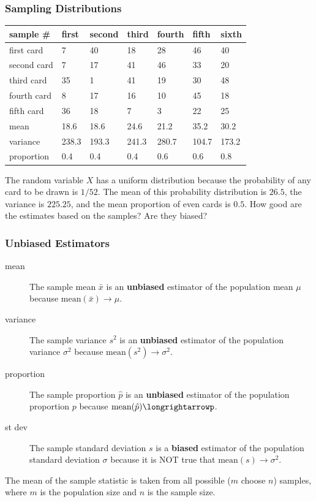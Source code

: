 \documentclass[xcolor=dvipsnames]{beamer}
\begin{document}
\begin{frame}
  \frametitle{Sampling Distributions}
\begin{tabular}{|l|l|l|l|l|l|l|}\hline
  sample \#   & first & second & third & fourth & fifth & sixth \\ \hline
  first card  & 7     & 40     & 18    & 28     & 46    & 40    \\ \hline
  second card & 7     & 17     & 41    & 46     & 33    & 20    \\ \hline
  third card  & 35    & 1      & 41    & 19     & 30    & 48    \\ \hline
  fourth card & 8     & 17     & 16    & 10     & 45    & 18    \\ \hline
  fifth card  & 36    & 18     & 7     & 3      & 22    & 25    \\ \hline
  mean        & 18.6  & 18.6   & 24.6  & 21.2   & 35.2  & 30.2  \\ \hline
  variance    & 238.3 & 193.3  & 241.3 & 280.7  & 104.7 & 173.2 \\ \hline
  proportion  & 0.4   & 0.4    & 0.4   & 0.6    & 0.6   & 0.8   \\ \hline
\end{tabular}

\medskip

The random variable $X$ has a \alert{uniform distribution} because
the probability of any card to be drawn is $1/52$. The mean of
this probability distribution is $26.5$, the variance is $225.25$,
and the mean proportion of even cards is $0.5$. How good are the
estimates based on the samples? Are they biased?
\end{frame}

\begin{frame}
  \frametitle{Unbiased Estimators}
  \begin{description}
  \item[mean] The \alert{sample mean $\bar{x}$} is an \textbf{unbiased}
    estimator of the \alert{population mean $\mu$} because
  $\mbox{mean}(\bar{x})\longrightarrow\mu$.
\item[variance] The \alert{sample variance $s^{2}$} is an \textbf{unbiased}
    estimator of the \alert{population variance $\sigma^{2}$} because
  $\mbox{mean}(s^{2})\longrightarrow\sigma^{2}$.
\item[proportion] The \alert{sample proportion $\hat{p}$} is an \textbf{unbiased}
    estimator of the \alert{population proportion $p$} because
  $\mbox{mean}(\hat{p})\longrightarrowp$.
\item[st dev] The \alert{sample standard deviation $s$} is a
  \textbf{biased} estimator of the \alert{population standard
    deviation $\sigma$} because it is NOT true that
  $\mbox{mean}(s)\longrightarrow\sigma^{2}$.
  \end{description}
  The mean of the sample statistic is taken from all possible ($m$
  choose $n$) samples, where $m$ is the population size and $n$ is the
  sample size.
\end{frame}
\end{document}
